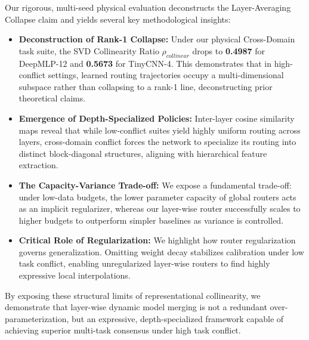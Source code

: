 Our rigorous, multi-seed physical evaluation deconstructs the Layer-Averaging Collapse claim and yields several key methodological insights:
\begin{itemize}
    \item \textbf{Deconstruction of Rank-1 Collapse:} Under our physical Cross-Domain task suite, the SVD Collinearity Ratio $\rho_{collinear}$ drops to \textbf{0.4987} for DeepMLP-12 and \textbf{0.5673} for TinyCNN-4. This demonstrates that in high-conflict settings, learned routing trajectories occupy a multi-dimensional subspace rather than collapsing to a rank-1 line, deconstructing prior theoretical claims.
    \item \textbf{Emergence of Depth-Specialized Policies:} Inter-layer cosine similarity maps reveal that while low-conflict suites yield highly uniform routing across layers, cross-domain conflict forces the network to specialize its routing into distinct block-diagonal structures, aligning with hierarchical feature extraction.
    \item \textbf{The Capacity-Variance Trade-off:} We expose a fundamental trade-off: under low-data budgets, the lower parameter capacity of global routers acts as an implicit regularizer, whereas our layer-wise router successfully scales to higher budgets to outperform simpler baselines as variance is controlled.
    \item \textbf{Critical Role of Regularization:} We highlight how router regularization governs generalization. Omitting weight decay stabilizes calibration under low task conflict, enabling unregularized layer-wise routers to find highly expressive local interpolations.
\end{itemize}

By exposing these structural limits of representational collinearity, we demonstrate that layer-wise dynamic model merging is not a redundant over-parameterization, but an expressive, depth-specialized framework capable of achieving superior multi-task consensus under high task conflict.
